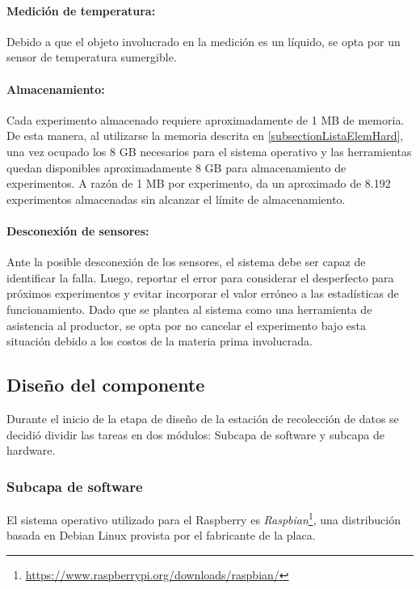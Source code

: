         \paragraph{Medición de temperatura:} 
            Debido a que el objeto involucrado en la medición es un líquido, se opta por un sensor de temperatura sumergible.
    
        \paragraph{Almacenamiento:} 
        Cada experimento almacenado requiere aproximadamente de 1 MB de memoria. De esta manera, al utilizarse la memoria descrita en \ref{subsectionListaElemHard}, una vez ocupado los 8 GB necesarios para el sistema operativo y las herramientas quedan disponibles aproximadamente 8 GB para almacenamiento de experimentos. A razón de 1 MB por experimento, da un aproximado de 8.192 experimentos almacenadas sin alcanzar el límite de almacenamiento. 
        
        \paragraph{Desconexión de sensores:} 
             Ante la posible desconexión de los sensores, el sistema debe ser capaz de identificar la falla. Luego, reportar el error para considerar el desperfecto para próximos experimentos y evitar incorporar el valor erróneo a las estadísticas de funcionamiento. Dado que se plantea al sistema como una herramienta de asistencia al productor, se opta por no cancelar el experimento bajo esta situación debido a los costos de la materia prima involucrada.
            
            
    \subsection{Diseño del componente}
            \par Durante el inicio de la etapa de diseño de la estación de recolección de datos se decidió dividir las tareas en dos módulos: Subcapa de software y subcapa de hardware.
            
            \subsubsection{Subcapa de software}
                \par El sistema operativo utilizado para el Raspberry\textsuperscript{\textregistered} es \textit{Raspbian}\footnote{\url{https://www.raspberrypi.org/downloads/raspbian/}}, una distribución basada en Debian Linux provista por el fabricante de la placa.
                
